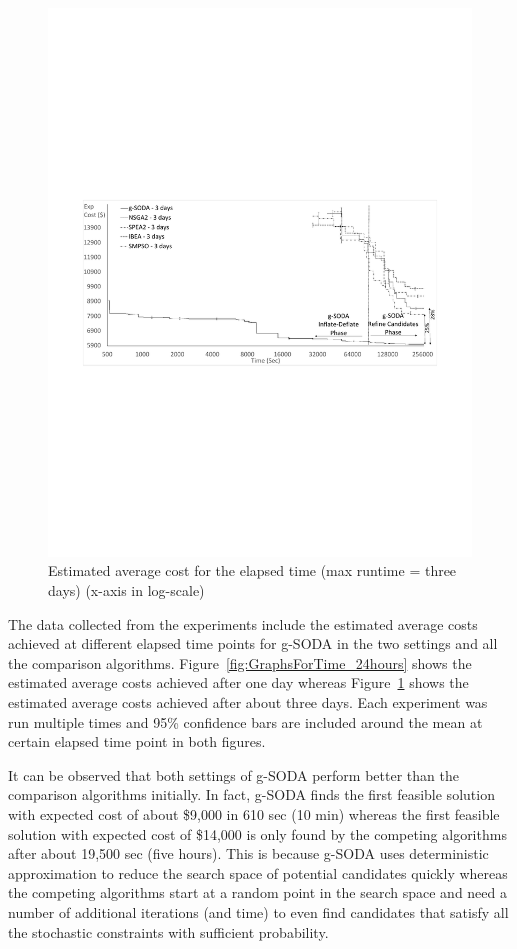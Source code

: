 \documentclass[a4paper, 12pt]{article} %
\begin{document}
\begin{figure}[t]
\begin{minipage}{.5\textwidth}
\begin{center}
	\includegraphics[width=\textwidth]{images/sodavsjmetal3day.pdf}
	\caption{Estimated average cost for the elapsed time (max runtime = three days) (x-axis in log-scale)}
	\label{fig:GraphsForTime_3days}       %
\end{center}
\end{minipage}
\end{figure}

The data collected from the experiments include the estimated average costs achieved at different elapsed time points for g-SODA in the two settings and all the comparison algorithms. 
Figure~\ref{fig:GraphsForTime_24hours} shows the estimated average costs achieved after one day whereas Figure~\ref{fig:GraphsForTime_3days} shows the estimated average costs achieved after about three days. Each experiment was run multiple times and 95\% confidence bars are included around the mean at certain elapsed time point in both figures. 

It can be observed that both settings of g-SODA perform better than the comparison algorithms initially. In fact, g-SODA finds the first feasible solution with expected cost of about \$9,000 in 610 sec (10 min) whereas the first feasible solution with expected cost of \$14,000 is only found by the competing algorithms after about 19,500 sec (five hours). This is because g-SODA uses deterministic approximation to reduce the search space of potential candidates quickly whereas the competing algorithms start at a random point in the search space and need a number of additional iterations (and time) to even find candidates that satisfy all the stochastic constraints with sufficient probability. 
\end{document}
